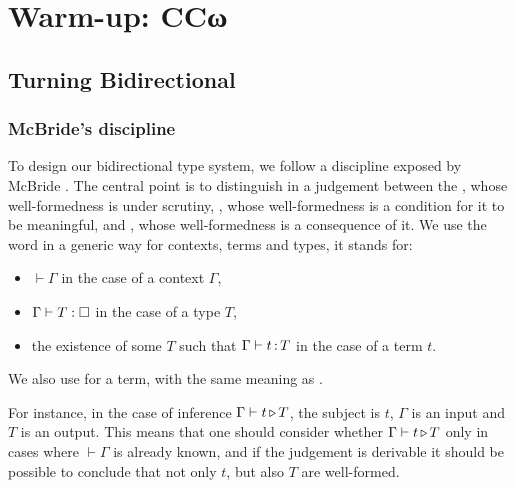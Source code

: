 \chapter{Warm-up: CCω}
\label{chap:bidir-ccw}

\margintoc


\section{Turning  Bidirectional}
\label{sec:bidir-ccw}

\subsection{McBride’s discipline}

To design our bidirectional type system, we follow a discipline exposed by McBride
.
The central point is to distinguish in a judgement between the ,
whose well-formedness is under scrutiny, ,
whose well-formedness is a condition for it to be meaningful,
and , whose well-formedness is a consequence of it.
We use the word  in a generic way for contexts, terms and types,
it stands for:
\begin{itemize}
  \item $\vdash \Gamma$ in the case of a context $\Gamma$,
  \item $\Gamma \vdash T : \uni$ in the case of a type $T$,
  \item the existence of some $T$ such that $\Gamma \vdash t \operatorname{:} T$ in the case of a term $t$.
\end{itemize}
We also use  for a term, with the same meaning as .

For instance, in the case of inference $\Gamma \vdash t \operatorname{\triangleright} T$, the subject is $t$,
$\Gamma$ is an input and $T$ is an output.
This means that one should consider whether $\Gamma \vdash t \operatorname{\triangleright} T$
only in cases where $\vdash \Gamma$ is already known,
and if the judgement is derivable it should be possible to conclude that
not only $t$, but also $T$ are well-formed.


